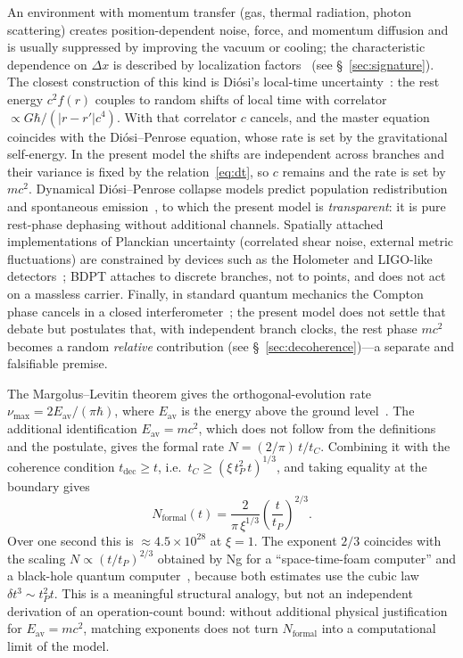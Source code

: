 \documentclass[11pt,a4paper]{article}
\begin{document}
An environment with momentum transfer (gas, thermal radiation, photon scattering) creates position-dependent noise, force, and momentum diffusion and is usually suppressed by improving the vacuum or cooling; the characteristic dependence on $\Delta x$ is described by localization factors~\cite{hornberger2004tli} (see \S~\ref{sec:signature}). The closest construction of this kind is Di\'osi's local-time uncertainty~\cite{diosi2005}: the rest energy \(c^2 f(r)\) couples to random shifts of local time with correlator \(\propto G\hbar/(|r-r'|c^4)\). With that correlator \(c\) cancels, and the master equation coincides with the Di\'osi--Penrose equation, whose rate is set by the gravitational self-energy. In the present model the shifts are independent across branches and their variance is fixed by the relation~\eqref{eq:dt}, so \(c\) remains and the rate is set by \(mc^2\). Dynamical Di\'osi--Penrose collapse models predict population redistribution and spontaneous emission~\cite{donadi2021}, to which the present model is \emph{transparent}: it is pure rest-phase dephasing without additional channels. Spatially attached implementations of Planckian uncertainty (correlated shear noise, external metric fluctuations) are constrained by devices such as the Holometer and LIGO-like detectors~\cite{chou2017holometer}; BDPT attaches to discrete branches, not to points, and does not act on a massless carrier. Finally, in standard quantum mechanics the Compton phase cancels in a closed interferometer~\cite{wolf2011compton}; the present model does not settle that debate but postulates that, with independent branch clocks, the rest phase $mc^2$ becomes a random \emph{relative} contribution (see \S~\ref{sec:decoherence})---a separate and falsifiable premise.

The Margolus--Levitin theorem gives the orthogonal-evolution rate $\nu_{\max}=2E_{\mathrm{av}}/(\pi\hbar)$, where $E_{\mathrm{av}}$ is the energy above the ground level~\cite{margolus1998}. The additional identification $E_{\mathrm{av}}=mc^2$, which does not follow from the definitions and the postulate, gives the formal rate $N=(2/\pi)\,t/t_C$. Combining it with the coherence condition $t_{\mathrm{dec}}\ge t$, i.e.\ $t_C\ge(\xi\,t_P^2\,t)^{1/3}$, and taking equality at the boundary gives
\begin{equation}
N_{\mathrm{formal}}(t)=\frac{2}{\pi\,\xi^{1/3}}\left(\frac{t}{t_P}\right)^{2/3}.
\end{equation}
Over one second this is $\approx4.5\times10^{28}$ at $\xi=1$. The exponent $2/3$ coincides with the scaling $N\propto(t/t_P)^{2/3}$ obtained by Ng for a ``space-time-foam computer'' and a black-hole quantum computer~\cite{ng2005foam}, because both estimates use the cubic law $\delta t^3\sim t_P^2t$. This is a meaningful structural analogy, but not an independent derivation of an operation-count bound: without additional physical justification for $E_{\mathrm{av}}=mc^2$, matching exponents does not turn $N_{\mathrm{formal}}$ into a computational limit of the model.
\end{document}
